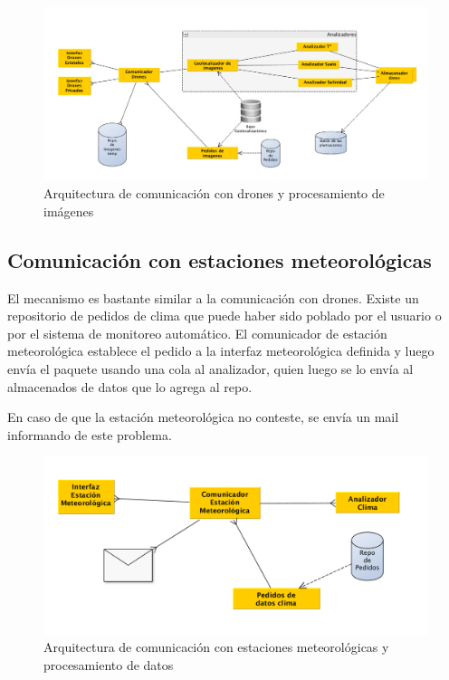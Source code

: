 \begin{figure}[h!]
  \centering
  \includegraphics[width=1\textwidth]{./images/arq_drones.png}
  \caption{Arquitectura de comunicación con drones y procesamiento de imágenes}
  \label{fig:clases4}
\end{figure}

\subsection{Comunicación con estaciones meteorológicas}

El mecanismo es bastante similar a la comunicación con drones. Existe un repositorio de pedidos de clima que puede haber sido poblado por el usuario o por el sistema de monitoreo automático. El comunicador de estación meteorológica establece el pedido a la interfaz meteorológica definida y luego envía el paquete usando una cola al analizador, quien luego se lo envía al almacenados de datos que lo agrega al repo.

En caso de que la estación meteorológica no conteste, se envía un mail informando de este problema.

\begin{figure}[h!]
  \centering
  \includegraphics[width=1\textwidth]{./images/arq_clima.png}
  \caption{Arquitectura de comunicación con estaciones meteorológicas y procesamiento de datos}
  \label{fig:clases4}
\end{figure}



